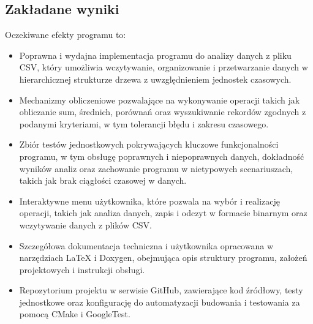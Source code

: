 \subsection{Zakładane wyniki}
Oczekiwane efekty programu to:
\begin{itemize}
    \item Poprawna i wydajna implementacja programu do analizy danych z pliku CSV, który umożliwia wczytywanie, organizowanie i przetwarzanie danych w hierarchicznej strukturze drzewa z uwzględnieniem jednostek czasowych.
    \item Mechanizmy obliczeniowe pozwalające na wykonywanie operacji takich jak obliczanie sum, średnich, porównań oraz wyszukiwanie rekordów zgodnych z podanymi kryteriami, w tym tolerancji błędu i zakresu czasowego.
    \item Zbiór testów jednostkowych pokrywających kluczowe funkcjonalności programu, w tym obsługę poprawnych i niepoprawnych danych, dokładność wyników analiz oraz zachowanie programu w nietypowych scenariuszach, takich jak brak ciągłości czasowej w danych.
    \item Interaktywne menu użytkownika, które pozwala na wybór i realizację operacji, takich jak analiza danych, zapis i odczyt w formacie binarnym oraz wczytywanie danych z plików CSV.
    \item Szczegółowa dokumentacja techniczna i użytkownika opracowana w narzędziach LaTeX i Doxygen, obejmująca opis struktury programu, założeń projektowych i instrukcji obsługi.
    \item Repozytorium projektu w serwisie GitHub, zawierające kod źródłowy, testy jednostkowe oraz konfigurację do automatyzacji budowania i testowania za pomocą CMake i GoogleTest.
\end{itemize}
